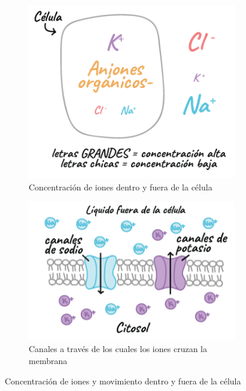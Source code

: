 \begin{figure}[h!]
        \centering
        \begin{subfigure}[b]{0.35\textwidth}
            \centering
            \includegraphics[width=\textwidth]{figures/concentracion_iones.png}
            \caption{Concentración de iones dentro y fuera de la célula}
            \label{fig:concentracion_iones}
        \end{subfigure}
        \hspace{1.5cm}
        \begin{subfigure}[b]{0.4\textwidth}  
            \centering 
            \includegraphics[width=\textwidth]{figures/canales_iones.png}
            \caption{Canales a través de los cuales los iones cruzan la membrana}
            \label{fig:canales_iones}
        \end{subfigure}
        \quad
        \caption{Concentración de iones y movimiento dentro y fuera de la célula}
\end{figure}
